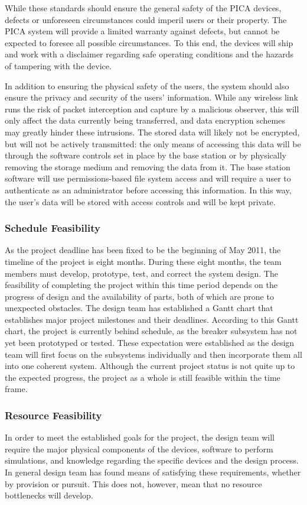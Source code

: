 While these standards should ensure the general safety of the PICA devices, defects or unforeseen circumstances could imperil users or their property. The PICA system will provide a limited warranty against defects, but cannot be expected to foresee all possible circumstances. To this end, the devices will ship and work with a disclaimer regarding safe operating conditions and the hazards of tampering with the device.

In addition to ensuring the physical safety of the users, the system should also ensure the privacy and security of the users' information. While any wireless link runs the risk of packet interception and capture by a malicious observer, this will only affect the data currently being transferred, and data encryption schemes may greatly hinder these intrusions. The stored data will likely not be encrypted, but will not be actively transmitted: the only means of accessing this data will be through the software controls set in place by the base station or by physically removing the storage medium and removing the data from it. The base station software will use permissions-based file system access and will require a user to authenticate as an administrator before accessing this information. In this way, the user's data will be stored with access controls and will be kept private.

\subsubsection{Schedule Feasibility} %
As the project deadline has been fixed to be the beginning of May 2011, the timeline of the project is eight months. During these eight months, the team members must develop, prototype, test, and correct the system design. The feasibility of completing the project within this time period depends on the progress of design and the availability of parts, both of which are prone to unexpected obstacles. The design team has established a Gantt chart that establishes major project milestones and their deadlines. According to this Gantt chart, the project is currently behind schedule, as the breaker subsystem has not yet been prototyped or tested. These expectation were established as the design team will first focus on the subsystems individually and then incorporate them all into one coherent system. Although the current project status is not quite up to the expected progress, the project as a whole is still feasible within the time frame.

\subsubsection{Resource Feasibility} %
In order to meet the established goals for the project, the design team will require the major physical components of the devices, software to perform simulations, and knowledge regarding the specific devices and the design process. In general design team has found means of satisfying these requirements, whether by provision or pursuit. This does not, however, mean that no resource bottlenecks will develop.

